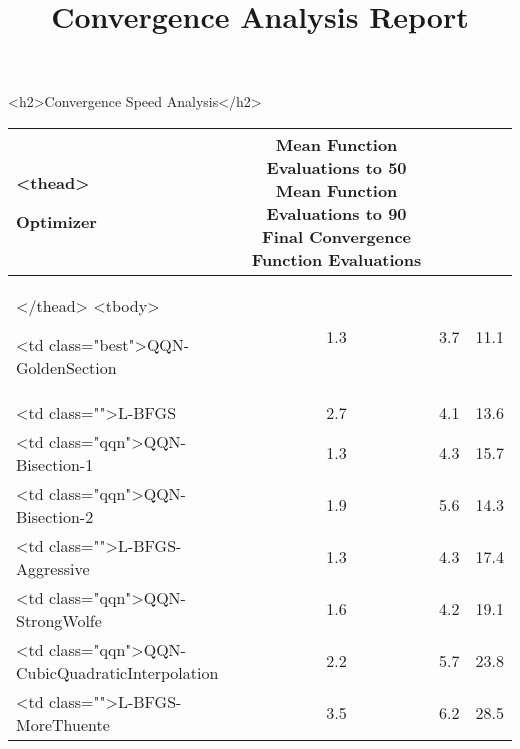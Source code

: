\documentclass{article}
\begin{document}
\title{Convergence Analysis Report}
\maketitle

    <h2>Convergence Speed Analysis</h2>
    \begin{tabular}{|l|c|c|c|}
\hline
        <thead>
            
                Optimizer & 
                Mean Function Evaluations to 50%
                Mean Function Evaluations to 90%
                Final Convergence Function Evaluations & 
             \\
\hline
        </thead>
        <tbody>
            
                <td class="best">QQN-GoldenSection & 
                1.3 & 
                3.7 & 
                11.1 & 
             \\
\hline
            
                <td class="">L-BFGS & 
                2.7 & 
                4.1 & 
                13.6 & 
             \\
\hline
            
                <td class="qqn">QQN-Bisection-1 & 
                1.3 & 
                4.3 & 
                15.7 & 
             \\
\hline
            
                <td class="qqn">QQN-Bisection-2 & 
                1.9 & 
                5.6 & 
                14.3 & 
             \\
\hline
            
                <td class="">L-BFGS-Aggressive & 
                1.3 & 
                4.3 & 
                17.4 & 
             \\
\hline
            
                <td class="qqn">QQN-StrongWolfe & 
                1.6 & 
                4.2 & 
                19.1 & 
             \\
\hline
            
                <td class="qqn">QQN-CubicQuadraticInterpolation & 
                2.2 & 
                5.7 & 
                23.8 & 
             \\
\hline
            
                <td class="">L-BFGS-MoreThuente & 
                3.5 & 
                6.2 & 
                28.5 & 
             \\
\hline
            

\end{tabular}
\end{document}
